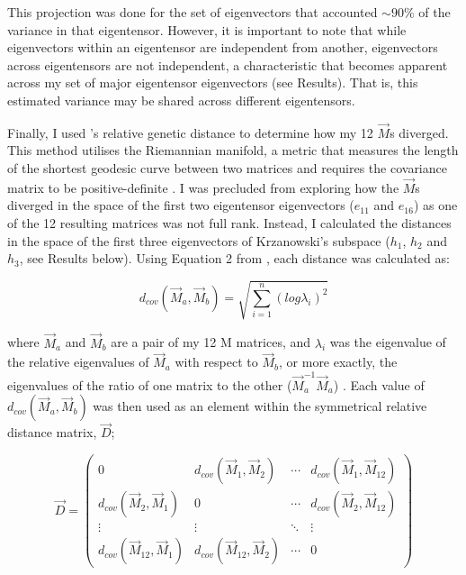 This projection was done for the set of eigenvectors that accounted $\sim 90\%$ of the variance in that eigentensor. However, it is important to note that while eigenvectors within an eigentensor are independent from another, eigenvectors across eigentensors are not independent, a characteristic that becomes apparent across my set of major eigentensor eigenvectors (see Results). That is, this estimated variance may be shared across different eigentensors.\par

Finally, I used \citet{Mitt09}'s relative genetic distance to determine how my 12 $\vec{M}$s diverged. This method utilises the Riemannian manifold, a metric that measures the length of the shortest geodesic curve between two matrices and requires the covariance matrix to be positive-definite \citep{Mitt09}. I was precluded from exploring how the $\vec{M}$s diverged in the space of the first two eigentensor eigenvectors ($e_{11}$ and $e_{16}$) as one of the 12 resulting matrices was not full rank. Instead, I calculated the distances in the space of the first three eigenvectors of Krzanowski’s subspace ($h_1$, $h_2$ and $h_3$, see Results below). Using Equation 2 from \citet{Mitt09}, each distance was calculated as:\par

\vspace{-\parskip}
\begin{equation}
d_{cov}(\vec{M}_a, \vec{M}_b) = \sqrt{ \sum_{i=1}^{n}(log \lambda_{i})^{2}}  \label{eqn:multi_5_mitte}
\end{equation}

\noindent where $\vec{M}_a$ and $\vec{M}_b$ are a pair of my 12 M matrices, and $\lambda_i$ was the eigenvalue of the relative eigenvalues of $\vec{M}_a$ with respect to $\vec{M}_b$, or more exactly, the eigenvalues of the ratio of one matrix to the other ($\vec{M}_a^{-1}\vec{M}_a$) \citep{Mitt09}. Each value of $d_{cov}(\vec{M}_a, \vec{M}_b)$ was then used as an element within the symmetrical relative distance matrix, $\vec{D}$;\par

\begin{equation}
\vec{D} =
\begin{pmatrix}
0 & d_{cov}(\vec{M}_1, \vec{M}_2) & \cdots & d_{cov}(\vec{M}_1, \vec{M}_{12})\\
d_{cov}(\vec{M}_2, \vec{M}_1) & 0 &  \cdots & d_{cov}(\vec{M}_2, \vec{M}_{12})\\
\vdots  & \vdots  & \ddots & \vdots  \\
d_{cov}(\vec{M}_{12}, \vec{M}_1) & d_{cov}(\vec{M}_{12}, \vec{M}_2) & \cdots  &0
\label{eqn:multi_6_D}
\end{pmatrix}
\end{equation}

